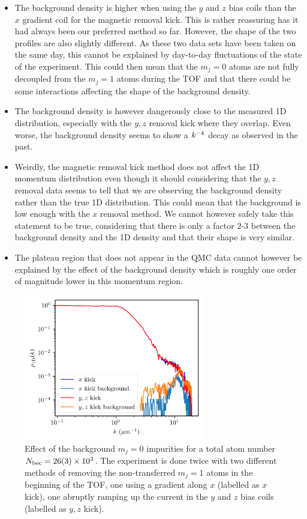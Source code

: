 \begin{itemize}
    \item The background density is higher when using the $y$ and $z$ bias coils than the $x$ gradient coil for the magnetic removal kick. This is rather reassuring has it had always been our preferred method so far. However, the shape of the two profiles are also slightly different. As these two data sets have been taken on the same day, this cannot be explained by day-to-day fluctuations of the state of the experiment. This could then mean that the $m_j=0$ atoms are not fully decoupled from the $m_j=1$ atoms during the TOF and that there could be some interactions affecting the shape of the background density. 
    \item The background density is however dangerously close to the measured 1D distribution, especially with the $y,z$ removal kick where they overlap. Even worse, the background density seems to show a $k^{-4}$ decay as observed in the past.
    \item Weirdly, the magnetic removal kick method does not affect the 1D momentum distribution even though it should considering that the $y,z$ removal data seems to tell that we are observing the background density rather than the true 1D distribution. This could mean that the background is low enough with the $x$ removal method. We cannot however safely take this statement to be true, considering that there is only a factor $2$-$3$ between the background density and the 1D density and that their shape is very similar.
    \item The plateau region that does not appear in the QMC data cannot however be explained by the effect of the background density which is roughly one order of magnitude lower in this momentum region.
\end{itemize}

\begin{figure}
    \centering
    \includegraphics[width=0.7\textwidth]{Fig/Chapter5/1D_background_low.png}
    \caption[Effect of the background $m_j=0$ impurities for a total atom number $\NBEC=26(3) \times 10^3$]{Effect of the background $m_j=0$ impurities for a total atom number $\NBEC=26(3) \times 10^3$. The experiment is done twice with two different methods of removing the non-transferred $m_j=1$ atoms in the beginning of the TOF, one using a gradient along $x$ (labelled as $x$ kick), one abruptly ramping up the current in the $y$ and $z$ bias coils (labelled as $y,z$ kick).}
    \label{fig:background_low_N}
\end{figure}

